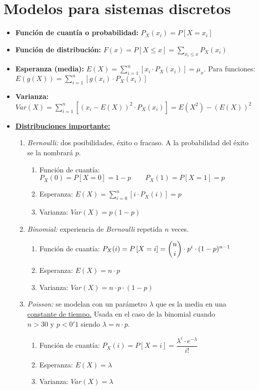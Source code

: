 \documentclass[a4paper, twocolumn, 10pt]{article}
\begin{document}
\section{Modelos para sistemas discretos}

\begin{itemize}
	\item \textbf{Función de cuantía o probabilidad:} $P_X(x_i) = P\left[X = x_i\right]$
	\item \textbf{Función de distribución:} $F(x) = P\left[X\leq x\right] = \sum\limits_{x_i \leq x} P_X(x_i)$
	\item \textbf{Esperanza (media):} $E(X) = \sum\limits_{i=1}^n\left[x_i \cdot P_X(x_i)\right] = \mu_x$. Para funciones: $E(g(X)) = \sum\limits_{i=1}^n\left[g(x_i) \cdot P_X(x_i)\right]$
	\item \textbf{Varianza:} $Var(X) = \sum\limits_{i=1}^n\left[\left(x_i - E(X)\right)^2\cdot P_X(x_i)\right] = E(X^2) - (E(X))^2$
	\item \underline{\textbf{Distribuciones importante:}}
	\begin{enumerate}
		\item \textit{Bernoulli:} dos posibilidades, éxito o fracaso. A la probabilidad del éxito se la nombrará $p$.
		\begin{enumerate}
			\item Función de cuantía: $P_X(0) = P\left[X=0\right] = 1 - p \qquad P_X(1) = P\left[X=1\right] = p$
			\item Esperanza: $E(X) = \sum\limits_{i=0}^n\left[i\cdot P_X(i)\right] = p$
			\item Varianza: $Var(X) = p(1-p)$
		\end{enumerate}
		\item \textit{Binomial:} experiencia de \textit{Bernoulli} repetida $n$ veces.
		\begin{enumerate}
			\item Función de cuantía: $P_X(i) = P\left[X=i\right] = \dbinom{n}{i}\cdot p^i\cdot (1-p)^{n-1}$
			\item Esperanza: $E(X) = n\cdot p$
			\item Varianza: $Var(X) = n\cdot p\cdot (1-p)$
		\end{enumerate}
		\item \textit{Poisson:} se modelan con un parámetro $\lambda$ que es la media en una \underline{constante de tiempo.} Usada en el caso de la binomial cuando $n > 30 \text{ y } p < 0'1$ siendo $\lambda = n\cdot p$.
		\begin{enumerate}
			\item Función de cuantía: $P_X(i) = P\left[X = i\right] = \dfrac{\lambda^i\cdot e^{-\lambda}}{i!}$
			\item Esperanza: $E(X) = \lambda$
			\item Varianza: $Var(X) = \lambda$
		\end{enumerate}
	\end{enumerate}
\end{itemize}
\end{document}
